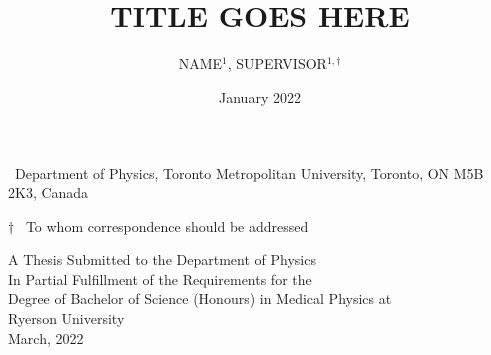 \title{\\[3em] TITLE GOES HERE}
\author{NAME$^{1}$, SUPERVISOR$^{1, \dagger}$}
\date{January 2022}

\maketitle
\thispagestyle{noNumber}

{\small
\begin{affiliations}
 \item \, Department of Physics, Toronto Metropolitan University, Toronto, ON M5B 2K3, Canada
 \item[$\dagger$] \, To whom correspondence should be addressed
\end{affiliations}
}


\vspace{3em}
\begin{flushright}
\small
A Thesis Submitted to the Department of Physics \\
In Partial Fulfillment of the Requirements for the \\
Degree of Bachelor of Science (Honours) in Medical Physics at \\
Ryerson University \\
March, 2022

\end{flushright}